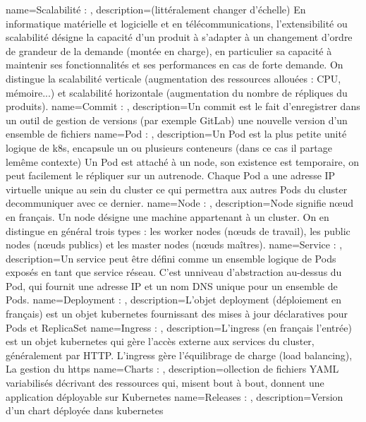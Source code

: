 {
    name=Scalabilité : ,
    description={(littéralement changer d'échelle) En informatique matérielle et logicielle et en télécommunications, l’extensibilité ou scalabilité désigne la capacité d'un produit à s'adapter à un changement d'ordre de grandeur de la demande (montée en charge), en particulier sa capacité à maintenir ses fonctionnalités et ses performances en cas de forte demande. On distingue la scalabilité verticale (augmentation des ressources allouées :  CPU, mémoire...) et scalabilité horizontale (augmentation du nombre de répliques du produits).}
}
{
    name=Commit : ,
    description={Un commit est le fait d’enregistrer dans un outil de gestion de versions (par exemple GitLab) une nouvelle version d’un ensemble de fichiers}
}
{
    name=Pod : ,
    description={Un Pod est la plus petite unité logique de k8s, encapsule un ou plusieurs conteneurs (dans ce cas il partage lemême contexte) Un Pod est attaché à un node, son existence est temporaire, on peut facilement le répliquer sur un autrenode. Chaque Pod a une adresse IP virtuelle unique au sein du cluster ce qui permettra aux autres Pods du cluster decommuniquer avec ce dernier.}
}
{
    name=Node : ,
    description={Node signifie nœud en français. Un node désigne une machine appartenant à un cluster. On en distingue en général trois types : les worker nodes (nœuds de travail), les public nodes (nœuds publics) et les master nodes (nœuds maîtres).}
}
{
    name=Service : ,
    description={Un service peut être défini comme un ensemble logique de Pods exposés en tant que service réseau. C’est unniveau d’abstraction au-dessus du Pod, qui fournit une adresse IP et un nom DNS unique pour un ensemble de Pods.}
}
{
    name=Deployment : ,
    description={L'objet deployment (déploiement en français) est un objet kubernetes fournissant des mises à jour déclaratives pour Pods et ReplicaSet}
}
{
    name=Ingress : ,
    description={L'ingress (en français l'entrée) est un objet kubernetes qui gère l'accès externe aux services du cluster, généralement par HTTP. L'ingress gère l'équilibrage de charge (load balancing), La gestion du https}
}
{
    name=Charts : ,
    description={ollection de fichiers YAML variabilisés décrivant des ressources qui, misent bout à bout, donnent une application déployable sur Kubernetes}
}
{
    name=Releases : ,
    description={Version d'un chart déployée dans kubernetes}
}
